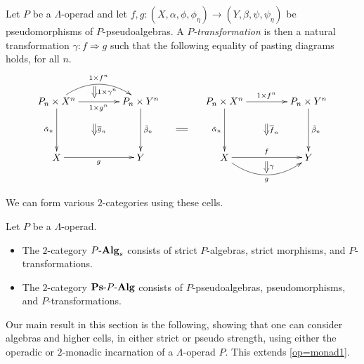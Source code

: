 \begin{Defi}\label{Defi:Ptrans}
Let $P$ be a $\Lambda$-operad and let $f, g \colon (X, \alpha, \phi, \phi_\eta) \rightarrow (Y, \beta, \psi, \psi_\eta)$ be pseudomorphisms of $P$-pseudoalgebras. A \textit{$P$-transformation} is then a natural transformation $\gamma \colon f \Rightarrow g$ such that the following equality of pasting diagrams holds, for all $n$.
    \[
        \xy
            (0,0)*+{P_n \times X^n}="00";
            (30,0)*+{P_n \times Y^n}="10";
            (0,-20)*+{X}="01";
            (30,-20)*+{Y}="11";
            {\ar@/^1.5pc/^{1 \times f^n} "00" ; "10"};
            {\ar_{1 \times g^n} "00" ; "10"};
            {\ar^{\tilde{\beta}_n} "10" ; "11"};
            {\ar_{\tilde{\alpha}_n} "00" ; "01"};
            {\ar_{g} "01" ; "11"};
            {\ar@{=>}^{1 \times \gamma^n} (13.5,5.5) ; (13.5,1.5)};
            {\ar@{=>}^{\overline{g}_n} (13.5,-8) ; (13.5,-12)};
            (60,0)*+{P_n \times X^n}="x00";
            (90,0)*+{P_n \times Y^n}="x10";
            (60,-20)*+{X}="x01";
            (90,-20)*+{Y}="x11";
            {\ar^{1 \times f^n} "x00" ; "x10"};
            {\ar^{\tilde{\beta}_n} "x10" ; "x11"};
            {\ar_{\tilde{\alpha}_n} "x00" ; "x01"};
            {\ar^{f} "x01" ; "x11"};
            {\ar@/_1.5pc/_{g} "x01" ; "x11"};
            {\ar@{=>}^{\gamma} (75,-21.5) ; (75,-25.5)};
            {\ar@{=>}^{\overline{f}_n} (75,-8) ; (75,-12)};
            {\ar@{=} (42.75,-10) ; (46.75,-10)};
        \endxy
    \]
\end{Defi}

We can form various $2$-categories using these cells.

\begin{Defi}\label{Defi:2cat-of-algs-lop}
Let $P$ be a $\Lambda$-operad.
\begin{itemize}
\item The $2$-category $P\mbox{-}\mathbf{Alg}_{s}$ consists of strict $P$-algebras, strict morphisms, and $P$-transformations.
\item The $2$-category $\mathbf{Ps}\mbox{-}P\mbox{-}\mathbf{Alg}$ consists of $P$-pseudoalgebras, pseudomorphisms, and $P$-transformations.
\end{itemize}
\end{Defi}

Our main result in this section is the following, showing that one can consider algebras and higher cells, in either strict or pseudo strength, using either the operadic or $2$-monadic incarnation of a $\Lambda$-operad $P$. This extends \cref{op=monad1}.

